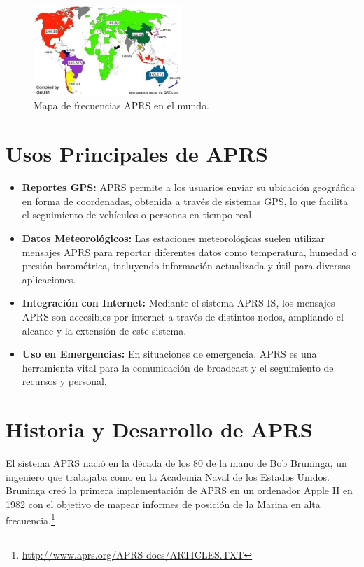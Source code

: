 \begin{figure}
	\centering
	\includegraphics[width=0.5\textwidth]{Imagenes//Chapter_1/mapa_frecuencias_aprs.jpg}
	\caption{Mapa de frecuencias APRS en el mundo.}
	\label{fig:freq-map}
\end{figure}


\section{Usos Principales de APRS}

\begin{itemize}
	\item \textbf{Reportes GPS:} APRS permite a los usuarios enviar su ubicación geográfica en forma de coordenadas, obtenida a través de sistemas GPS, lo que facilita el seguimiento de vehículos o personas en tiempo real.

	\item \textbf{Datos Meteorológicos:} Las estaciones meteorológicas suelen utilizar mensajes APRS para reportar diferentes datos como temperatura, humedad o presión barométrica, incluyendo información actualizada y útil para diversas aplicaciones.

	\item \textbf{Integración con Internet:} Mediante el sistema APRS-IS, los mensajes APRS son accesibles por internet a través de distintos nodos, ampliando el alcance y la extensión de este sistema.

	\item \textbf{Uso en Emergencias:} En situaciones de emergencia, APRS es una herramienta vital para la comunicación de broadcast y el seguimiento de recursos y personal.
\end{itemize}

\section{Historia y Desarrollo de APRS}

El sistema APRS nació en la década de los 80 de la mano de Bob Bruninga, un ingeniero que trabajaba como en la Academia Naval de los Estados Unidos. Bruninga creó la primera implementación de APRS en un ordenador Apple II en 1982 con el objetivo de mapear informes de posición de la Marina en alta frecuencia.\footnote{\url{http://www.aprs.org/APRS-docs/ARTICLES.TXT}} %

